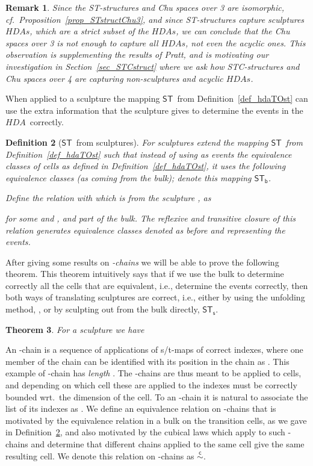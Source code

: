\documentclass[submission,copyright,creativecommons]{eptcs}
\newtheorem{theorem}{Theorem}[section]
\newtheorem{definition}[theorem]{Definition}
\newtheorem{remark}[theorem]{Remark}
\newcommand\HDA{\ensuremath{\mathit{HDA}}}
\newcommand\HDAs{\ensuremath{\mathit{HDAs}}}
\newcommand\hintost{\ensuremath{\mathsf{ST}}}
\newcommand\sculpintost{\ensuremath{\mathsf{ST}_{\!\mathsf{s}}}}
\newcommand\hintostScultures{\ensuremath{\mathsf{ST}_{\!\mathsf{b}}}}
\newcommand\chainEquivHDAsculpture{\ensuremath{\overset{\mathsf{c}}{\sim}}}
\begin{document}
\begin{remark}
Since the ST-structures and Chu spaces over 3 are isomorphic, cf.~Proposition~\ref{prop_STstructChu3}, and since ST-structures capture sculptures \HDAs, which are a strict subset of the \HDAs, we can conclude that the Chu spaces over 3 is not enough to capture all \HDAs, not even the acyclic ones. This observation is supplementing the results of Pratt, and is motivating our investigation in Section~\ref{sec_STCstruct} where we ask how STC-structures and Chu spaces over 4 are capturing non-sculptures and acyclic \HDAs.
\end{remark}

When applied to a sculpture  the mapping \hintost\ from Definition~\ref{def_hdaTOst} can use the extra information that the sculpture gives to determine the events in the \HDA\ correctly.

\begin{definition}[\hintost\ from sculptures]\label{def_hdaTOst_sculptures}
For sculptures  extend the mapping \hintost\ from Definition~\ref{def_hdaTOst} such that instead of using as events the equivalence classes of  cells as defined in Definition~\ref{def_hdaTOst}, it uses the following equivalence classes (as coming from the bulk); denote this mapping \hintostScultures.

Define the relation  with  which is from the sculpture , as 

for some  and , and  part of the bulk. The reflexive and transitive closure of this relation generates equivalence classes denoted as before  and representing the \emph{events}.
\end{definition}

After giving some results on \textit{-chains} we will be able to prove the following theorem.
This theorem intuitively says that if we use the bulk to determine correctly all the cells that are equivalent, i.e., determine the events correctly, then both ways of translating sculptures are correct, i.e., either by using the unfolding method, , or by sculpting out from the bulk directly, \sculpintost.

\begin{theorem}\label{th_on_scultures}
For a sculpture  we have

\end{theorem}


An -chain is a sequence of applications of s/t-maps  of correct indexes, where one member of the chain can be identified with its position in the chain as . This example of -chain has \emph{length} . The -chains are thus meant to be applied to cells, and depending on which cell these are applied to the indexes  must be correctly bounded wrt.\ the dimension of the cell. To an -chain it is natural to associate the list of its indexes as . We define an equivalence relation on -chains that is motivated by the equivalence relation in a bulk on the transition cells, as we gave in Definition~\ref{def_hdaTOst_sculptures}, and also motivated by the cubical laws which apply to such -chains and determine that different chains applied to the same cell give the same resulting cell. We denote this relation on -chains as \chainEquivHDAsculpture.
\end{document}
